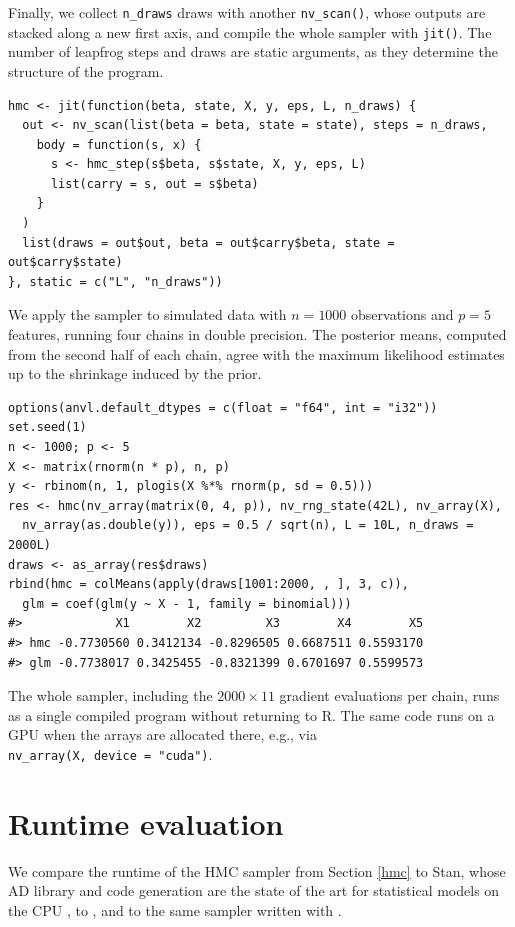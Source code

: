 Finally, we collect \texttt{n\_draws} draws with another \texttt{nv\_scan()}, whose outputs are stacked along a new first axis, and compile the whole sampler with \texttt{jit()}.
The number of leapfrog steps and draws are static arguments, as they determine the structure of the program.

\begin{verbatim}
hmc <- jit(function(beta, state, X, y, eps, L, n_draws) {
  out <- nv_scan(list(beta = beta, state = state), steps = n_draws,
    body = function(s, x) {
      s <- hmc_step(s$beta, s$state, X, y, eps, L)
      list(carry = s, out = s$beta)
    }
  )
  list(draws = out$out, beta = out$carry$beta, state = out$carry$state)
}, static = c("L", "n_draws"))
\end{verbatim}

We apply the sampler to simulated data with \(n = 1000\) observations and \(p = 5\) features, running four chains in double precision.
The posterior means, computed from the second half of each chain, agree with the maximum likelihood estimates up to the shrinkage induced by the prior.

\begin{verbatim}
options(anvl.default_dtypes = c(float = "f64", int = "i32"))
set.seed(1)
n <- 1000; p <- 5
X <- matrix(rnorm(n * p), n, p)
y <- rbinom(n, 1, plogis(X %*% rnorm(p, sd = 0.5)))
res <- hmc(nv_array(matrix(0, 4, p)), nv_rng_state(42L), nv_array(X),
  nv_array(as.double(y)), eps = 0.5 / sqrt(n), L = 10L, n_draws = 2000L)
draws <- as_array(res$draws)
rbind(hmc = colMeans(apply(draws[1001:2000, , ], 3, c)),
  glm = coef(glm(y ~ X - 1, family = binomial)))
#>             X1        X2         X3        X4        X5
#> hmc -0.7730560 0.3412134 -0.8296505 0.6687511 0.5593170
#> glm -0.7738017 0.3425455 -0.8321399 0.6701697 0.5599573
\end{verbatim}

The whole sampler, including the \(2000 \times 11\) gradient evaluations per chain, runs as a single compiled program without returning to R.
The same code runs on a GPU when the arrays are allocated there, e.g., via \texttt{nv\_array(X,\ device\ =\ "cuda")}.

\section{Runtime evaluation}\label{runtime}

We compare the runtime of the HMC sampler from Section \ref{hmc} to Stan, whose AD library and code generation are the state of the art for statistical models on the CPU \citep{ref-stanmath}, to , and to the same sampler written with .

